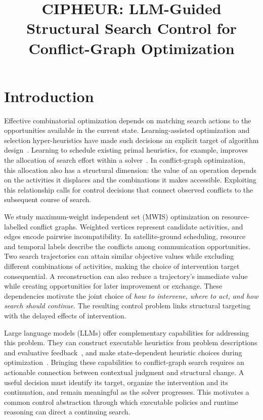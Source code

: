 \documentclass[sigconf,anonymous]{aamas}
\title[CIPHEUR: Structural Search Control]{CIPHEUR: LLM-Guided Structural Search Control for Conflict-Graph Optimization}
\begin{document}
\maketitle

\section{Introduction}

Effective combinatorial optimization depends on matching search actions to the opportunities available in the current state. Learning-assisted optimization and selection hyper-heuristics have made such decisions an explicit target of algorithm design~\cite{bengio2021methodological,drake2020selection}. Learning to schedule existing primal heuristics, for example, improves the allocation of search effort within a solver~\cite{chmiela2021schedule}. In conflict-graph optimization, this allocation also has a structural dimension: the value of an operation depends on the activities it displaces and the combinations it makes accessible. Exploiting this relationship calls for control decisions that connect observed conflicts to the subsequent course of search.

We study maximum-weight independent set (MWIS) optimization on resource-labelled conflict graphs. Weighted vertices represent candidate activities, and edges encode pairwise incompatibility. In satellite-ground scheduling, resource and temporal labels describe the conflicts among communication opportunities. Two search trajectories can attain similar objective values while excluding different combinations of activities, making the choice of intervention target consequential. A reconstruction can also reduce a trajectory's immediate value while creating opportunities for later improvement or exchange. These dependencies motivate the joint choice of \emph{how to intervene, where to act, and how search should continue}. The resulting control problem links structural targeting with the delayed effects of intervention.

Large language models (LLMs) offer complementary capabilities for addressing this problem. They can construct executable heuristics from problem descriptions and evaluative feedback~\cite{romeraparedes2024funsearch,liu2024eoh,ye2024reevo}, and make state-dependent heuristic choices during optimization~\cite{zhang2025laos,yang2025heuragenix}. Bringing these capabilities to conflict-graph search requires an actionable connection between contextual judgment and structural change. A useful decision must identify its target, organize the intervention and its continuation, and remain meaningful as the solver progresses. This motivates a common control abstraction through which executable policies and runtime reasoning can direct a continuing search.
\end{document}
